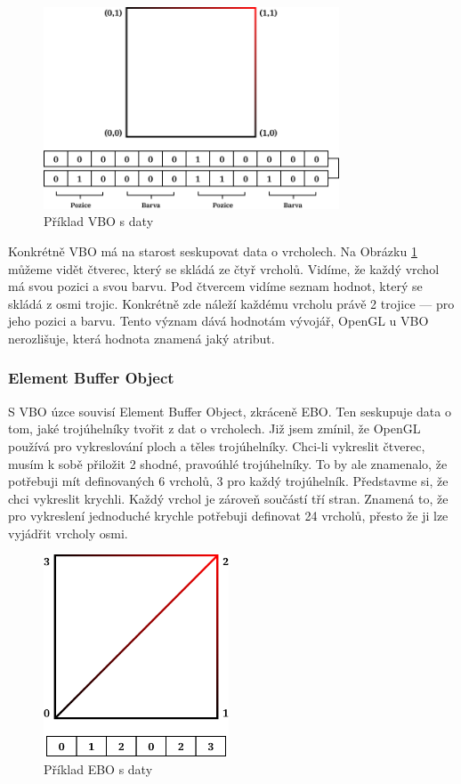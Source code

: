 \documentclass[12pt]{article}
\begin{document}
\vspace{0.5cm}
\begin{figure}[h]
    \centering
    \includegraphics[height=6cm]{images/vbo.png}
    \caption{Příklad VBO s daty}
    \label{fig:Příklad VBO s daty}
\end{figure}

Konkrétně VBO má na starost seskupovat data o vrcholech. Na Obrázku \ref{fig:Příklad VBO s daty} můžeme vidět čtverec, který se skládá ze čtyř vrcholů. Vidíme, že každý vrchol má svou pozici a svou barvu. Pod čtvercem vidíme seznam hodnot, který se skládá z osmi trojic. Konkrétně zde náleží každému vrcholu právě 2 trojice — pro jeho pozici a barvu. Tento význam dává hodnotám vývojář, OpenGL u VBO nerozlišuje, která hodnota znamená jaký atribut.

\subsubsection{Element Buffer Object}

S VBO úzce souvisí Element Buffer Object, zkráceně EBO. Ten seskupuje data o tom, jaké trojúhelníky tvořit z dat o vrcholech. Již jsem zmínil, že OpenGL používá pro vykreslování ploch a těles trojúhelníky. Chci-li vykreslit čtverec, musím k sobě přiložit 2 shodné, pravoúhlé trojúhelníky. To by ale znamenalo, že potřebuji mít definovaných 6 vrcholů, 3 pro každý trojúhelník. Představme si, že chci vykreslit krychli. Každý vrchol je zároveň součástí tří stran. Znamená to, že pro vykreslení jednoduché krychle potřebuji definovat 24 vrcholů, přesto že ji lze vyjádřit vrcholy osmi. \cite{vao_vbo_ebo}

\vspace{0.5cm}
\begin{figure}[h]
    \centering
    \includegraphics[height=6cm]{images/ebo.png}
    \caption{Příklad EBO s daty}
    \label{fig:Příklad EBO s daty}
\end{figure}
\end{document}

